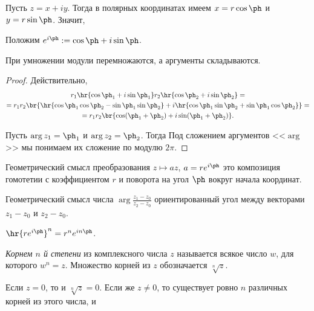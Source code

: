 \documentclass[a4paper]{article}
\begin{document}
Пусть $z = x+iy$. Тогда в полярных координатах имеем $x = r \cos \ph$ и $y = r\sin \ph$. Значит,

\begin{df}
Положим $e^{i\ph} := \cos \ph + i\sin \ph$.
\end{df}

\begin{stm}
При умножении модули перемножаются, а аргументы складываются.
\end{stm}
\begin{proof}
Действительно,
\begin{multline*}
r_1 \hr{\cos \ph_1 + i\sin \ph_1}r_2 \hr{\cos \ph_2 + i\sin \ph_2} =\\=
r_1 r_2 \br{\hr{\cos \ph_1 \cos \ph_2 - \sin \ph_1 \sin \ph_2} +
i\hr{\cos \ph _1 \sin \ph _2 + \sin \ph _1 \cos \ph _2}} =\\=
r_1 r_2 \br{\cos(\ph_1 + \ph _2) + i\sin(\ph_1 + \ph_2)}.
\end{multline*}

Пусть $\arg z_1 = \ph_1$ и $\arg z_2 = \ph_2$. Тогда
Под сложением аргументов <<$\arg$>> мы понимаем их сложение по модулю $2\pi$.
\end{proof}

\begin{imp}
Геометрический смысл преобразования $z \mapsto az$, $a = r e^{i\ph}$ это композиция гомотетии с коэффициентом $r$
и поворота на угол $\ph$ вокруг начала координат.
\end{imp}

\begin{imp}
Геометрический смысл числа $\arg\frac{z_1 - z_0}{z_2 - z_0}$ ориентированный угол между векторами $z_1-z_0$ и $z_2-z_0$.
\end{imp}

\begin{imp}
$\hr{re^{i\ph}}^n = r^ne^{in\ph}$.
\end{imp}

\begin{df}
\emph{Корнем $n$ й степени} из комплексного числа $z$ называется всякое число $w$, для которого $w^n = z$.
Множество корней из $z$ обозначается $\sqrt[n]z$.
\end{df}

\begin{stm}
Если $z = 0$, то и $\sqrt[n]{z} = 0$. Если же $z \neq 0$, то существует ровно $n$ различных корней
из этого числа, и
\end{stm}
\end{document}
